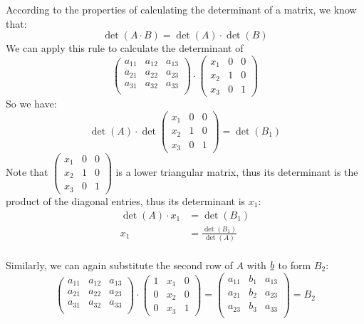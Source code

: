 According to the properties of calculating the determinant of a matrix, we know that:
$$\det(A\cdot B) = \det(A)\cdot \det(B)$$
We can apply this rule to calculate the determinant of $$\begin{pmatrix}
a_{11} & a_{12} & a_{13}\\
a_{21} & a_{22} & a_{23}\\
a_{31} & a_{32} & a_{33}\\
\end{pmatrix}\cdot \begin{pmatrix}
x_1 & 0 & 0\\
x_2 & 1 & 0\\
x_3 & 0 & 1
\end{pmatrix}$$
So we have:
$$\det(A) \cdot \det\begin{pmatrix}
x_1 & 0 & 0\\
x_2 & 1 & 0\\
x_3 & 0 & 1
\end{pmatrix} = \det(B_1)$$
Note that $\begin{pmatrix}
x_1 & 0 & 0\\
x_2 & 1 & 0\\
x_3 & 0 & 1
\end{pmatrix}$ is a lower triangular matrix, thus its determinant is the product of the diagonal entries, thus its determinant is $x_1$:
\begin{align*}
\det(A)\cdot x_1 &= \det(B_1)\\
x_1 &=\frac{\det(B_1)}{\det(A)}
\end{align*}\\
Similarly, we can again substitute the second row of $A$ with $\underline{b}$ to form $B_2$:
\[
\begin{pmatrix}
a_{11} & a_{12} & a_{13}\\
a_{21} & a_{22} & a_{23}\\
a_{31} & a_{32} & a_{33}\\
\end{pmatrix}\cdot \begin{pmatrix}
1 & x_1 & 0\\
0 & x_2 & 0\\
0 & x_3 & 1
\end{pmatrix} = \begin{pmatrix}
a_{11} & b_{1} & a_{13}\\
a_{21} & b_{2} & a_{23}\\
a_{23} & b_{3} & a_{33}\\
\end{pmatrix} = B_2
\]

